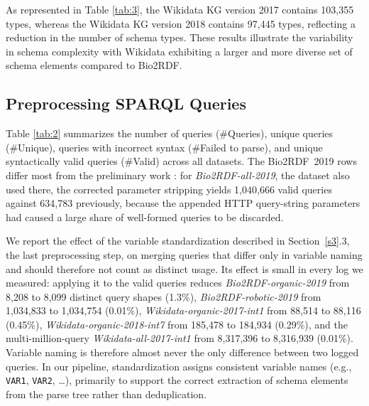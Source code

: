 \documentclass[sw]{iosart2x}
\begin{document}
As represented in Table \ref{tab:3}, the Wikidata KG version 2017 contains 103,355 types, whereas the Wikidata KG version 2018 contains 97,445 types, reflecting a reduction in the number of schema types. These results illustrate the variability in schema complexity with Wikidata exhibiting a larger and more diverse set of schema elements compared to Bio2RDF.
\begin{table}[ht]
\centering
\caption{Total schema elements Statistics per KG version}
\label{tab:3}
\end{table}


\subsection{Preprocessing SPARQL Queries}
Table \ref{tab:2} summarizes the number of queries (\#Queries), unique queries (\#Unique), queries with incorrect syntax (\#Failed to parse), and unique syntactically valid queries (\#Valid) across all datasets. The Bio2RDF~2019 rows differ most from the preliminary work \cite{mohammadi2024analyzing}: for \emph{Bio2RDF-all-2019}, the dataset also used there, the corrected parameter stripping yields 1{,}040{,}666 valid queries against 634{,}783 previously, because the appended HTTP query-string parameters had caused a large share of well-formed queries to be discarded.

We report the effect of the variable standardization described in Section~\ref{s3}.3, the last preprocessing step, on merging queries that differ only in variable naming and should therefore not count as distinct usage. Its effect is small in every log we measured: applying it to the valid queries reduces \emph{Bio2RDF-organic-2019} from 8{,}208 to 8{,}099 distinct query shapes (1.3\%), \emph{Bio2RDF-robotic-2019} from 1{,}034{,}833 to 1{,}034{,}754 (0.01\%), \emph{Wikidata-organic-2017-int1} from 88{,}514 to 88{,}116 (0.45\%), \emph{Wikidata-organic-2018-int7} from 185{,}478 to 184{,}934 (0.29\%), and the multi-million-query \emph{Wikidata-all-2017-int1} from 8{,}317{,}396 to 8{,}316{,}939 (0.01\%). Variable naming is therefore almost never the only difference between two logged queries.  In our pipeline, standardization assigns consistent variable names (e.g., \texttt{VAR1}, \texttt{VAR2}, \ldots), primarily to support the correct extraction of schema elements from the parse tree rather than deduplication.
\end{document}
